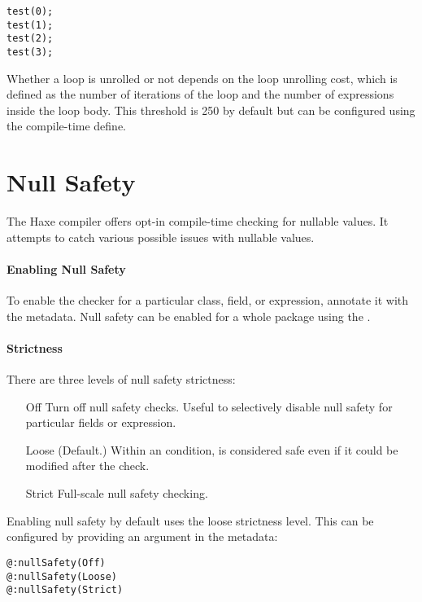 \begin{lstlisting}
test(0);
test(1);
test(2);
test(3);
\end{lstlisting}

Whether a loop is unrolled or not depends on the loop unrolling cost, which is defined as the number of iterations of the loop and the number of expressions inside the loop body. This threshold is 250 by default but can be configured using the  compile-time define.


\section{Null Safety}
\label{cr-null-safety}

The Haxe compiler offers opt-in compile-time checking for nullable values. It attempts to catch various possible issues with nullable values.

\paragraph{Enabling Null Safety}

To enable the checker for a particular class, field, or expression, annotate it with the  metadata. Null safety can be enabled for a whole package using the  .

\paragraph{Strictness}

There are three levels of null safety strictness:

\begin{itemize}
	\item[Off] Turn off null safety checks. Useful to selectively disable null safety for particular fields or expression.
	\item[Loose] (Default.) Within an  condition,  is considered safe even if it could be modified after the check.
	\item[Strict] Full-scale null safety checking.
\end{itemize}

Enabling null safety by default uses the loose strictness level. This can be configured by providing an argument in the metadata:

\begin{lstlisting}
@:nullSafety(Off)
@:nullSafety(Loose)
@:nullSafety(Strict)
\end{lstlisting}

